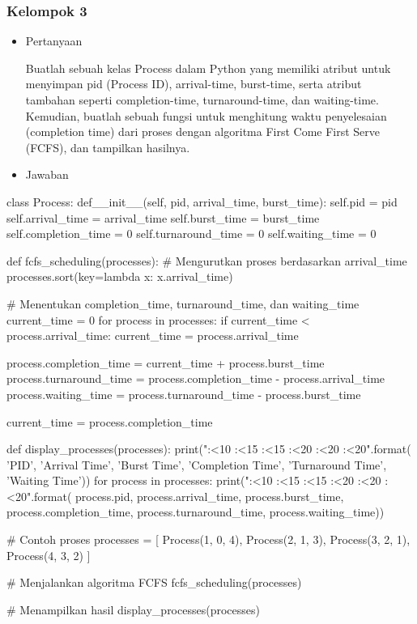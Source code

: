\documentclass[12pt]{article}
\begin{document}
\subsubsection{Kelompok 3}
\begin{itemize}
\item Pertanyaan 

Buatlah sebuah kelas Process dalam Python yang memiliki atribut untuk menyimpan pid (Process ID), arrival-time, burst-time, serta atribut tambahan seperti completion-time, turnaround-time, dan waiting-time. Kemudian, buatlah sebuah fungsi untuk menghitung waktu penyelesaian (completion time) dari proses dengan algoritma First Come First Serve (FCFS), dan tampilkan hasilnya.
\end{itemize}
\begin{itemize}
 \item Jawaban
\end{itemize}
\begin{python}
class Process:
    def__init__(self, pid, arrival_time, burst_time):
        self.pid = pid
        self.arrival_time = arrival_time
        self.burst_time = burst_time
        self.completion_time = 0
        self.turnaround_time = 0
        self.waiting_time = 0

    def fcfs_scheduling(processes):
    # Mengurutkan proses berdasarkan arrival_time
    processes.sort(key=lambda x: x.arrival_time)
    
    # Menentukan completion_time, turnaround_time, dan waiting_time
    current_time = 0
    for process in processes:
        if current_time < process.arrival_time:
            current_time = process.arrival_time
        
        process.completion_time = current_time + process.burst_time
        process.turnaround_time = process.completion_time - process.arrival_time
        process.waiting_time = process.turnaround_time - process.burst_time
        
        current_time = process.completion_time

def display_processes(processes):
    print("{:<10} {:<15} {:<15} {:<20} {:<20} {:<20}".format(
        'PID', 'Arrival Time', 'Burst Time', 'Completion Time', 'Turnaround Time', 'Waiting Time'))
    for process in processes:
        print("{:<10} {:<15} {:<15} {:<20} {:<20} {:<20}".format(
            process.pid, process.arrival_time, process.burst_time, process.completion_time, process.turnaround_time, process.waiting_time))

# Contoh proses
processes = [
    Process(1, 0, 4),
    Process(2, 1, 3),
    Process(3, 2, 1),
    Process(4, 3, 2)
]

# Menjalankan algoritma FCFS
fcfs_scheduling(processes)

# Menampilkan hasil
display_processes(processes)
\end{python}
\end{document}
